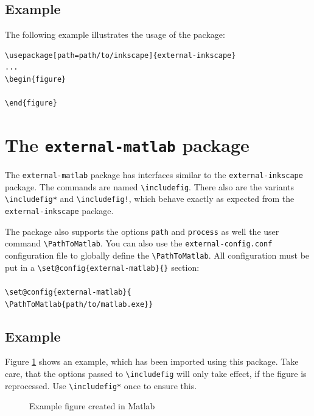 \documentclass{article}
\let\otextbackslash\textbackslash
\renewcommand\textbackslash{{\rmfamily\otextbackslash}}
\begin{document}
\subsection{Example}
The following example illustrates the usage of the package:

\begin{verbatim}
\usepackage[path=path/to/inkscape]{external-inkscape}
...
\begin{figure}
  
\end{figure}
\end{verbatim}



\section{The \texttt{external-matlab} package}
The \texttt{external-matlab} package has interfaces similar to the \texttt{external-inkscape} package. The commands are named \texttt{\textbackslash includefig}. There also are the variants \texttt{\textbackslash includefig*} and \texttt{\textbackslash includefig!}, which behave exactly as expected from the \texttt{external-inkscape} package.

The package also supports the options \texttt{path} and \texttt{process} as well the user command \texttt{\textbackslash PathToMatlab}. You can also use the \texttt{external-config.conf} configuration file to globally define the \texttt{\textbackslash PathToMatlab}. All configuration must be put in a \texttt{\textbackslash set@config\{external-matlab\}\{<config commands>\}} section: \\\\
\texttt{\textbackslash set@config\{external-matlab\}\{ \\ 
\textbackslash PathToMatlab\{path/to/matlab.exe\}\}}

\subsection{Example}
Figure \ref{fig:example:fig} shows an example, which has been imported using this package. Take care, that the options passed to \texttt{\textbackslash includefig} will only take effect, if the figure is reprocessed. Use \texttt{\textbackslash includefig*} once to ensure this.

\begin{figure}[ht]%
  \centering%
	\caption{Example figure created in Matlab}%
	\label{fig:example:fig}%
\end{figure}
\end{document}
